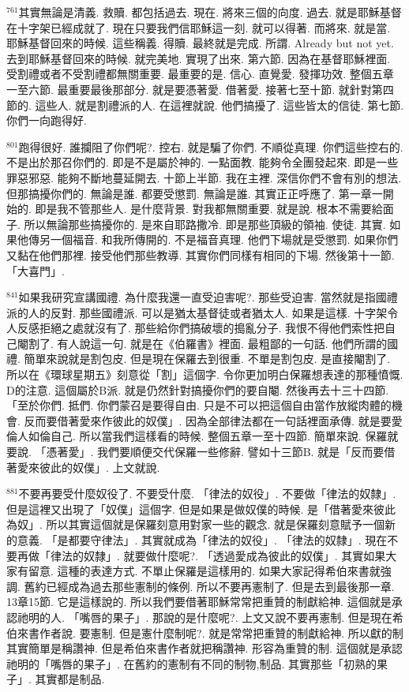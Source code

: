 \documentclass{book}
\begin{document}
$^{761}$其實無論是清義.
救贖.
都包括過去.
現在.
將來三個的向度.
過去.
就是耶穌基督在十字架已經成就了.
現在只要我們信耶穌這一刻.
就可以得著.
而將來.
就是當.
耶穌基督回來的時候.
這些稱義.
得贖.
最終就是完成.
所謂.
Already but not yet.
去到耶穌基督回來的時候.
就完美地.
實現了出來.
第六節.
因為在基督耶穌裡面.
受割禮或者不受割禮都無關重要.
最重要的是.
信心.
直覺愛.
發揮功效.
整個五章一至六節.
最重要最後那部分.
就是要憑著愛.
借著愛.
接著七至十節.
就針對第四節的.
這些人.
就是割禮派的人.
在這裡就說.
他們搞擾了.
這些皆太的信徒.
第七節.
你們一向跑得好.

$^{801}$跑得很好.
誰攔阻了你們呢?.
控右.
就是騙了你們.
不順從真理.
你們這些控右的.
不是出於那召你們的.
即是不是屬於神的.
一點面教.
能夠令全團發起來.
即是一些罪惡邪惡.
能夠不斷地蔓延開去.
十節上半節.
我在主裡.
深信你們不會有別的想法.
但那搞擾你們的.
無論是誰.
都要受懲罰.
無論是誰.
其實正正呼應了.
第一章一開始的.
即是我不管那些人.
是什麼背景.
對我都無關重要.
就是說.
根本不需要給面子.
所以無論那些搞擾你的.
是來自耶路撒冷.
即是那些頂級的領袖.
使徒.
其實.
如果他傳另一個福音.
和我所傳開的.
不是福音真理.
他們下場就是受懲罰.
如果你們又黏在他們那裡.
接受他們那些教導.
其實你們同樣有相同的下場.
然後第十一節.
「大喜門」.

$^{841}$如果我研究宣講國禮.
為什麼我還一直受迫害呢?.
那些受迫害.
當然就是指國禮派的人的反對.
那些國禮派.
可以是猶太基督徒或者猶太人.
如果是這樣.
十字架令人反感拒絕之處就沒有了.
那些給你們搞破壞的搗亂分子.
我恨不得他們索性把自己閹割了.
有人說這一句.
就是在《伯羅書》裡面.
最粗鄙的一句話.
他們所謂的國禮.
簡單來說就是割包皮.
但是現在保羅去到很重.
不單是割包皮.
是直接閹割了.
所以在《環球星期五》刻意從「割」這個字.
令你更加明白保羅想表達的那種憤慨.
D的注意.
這個屬於B派.
就是仍然針對搞擾你們的要自閹.
然後再去十三十四節.
「至於你們.
抵們.
你們蒙召是要得自由.
只是不可以把這個自由當作放縱肉體的機會.
反而要借著愛來作彼此的奴僕」.
因為全部律法都在一句話裡面承傳.
就是要愛倫人如倫自己.
所以當我們這樣看的時候.
整個五章一至十四節.
簡單來說.
保羅就要說.
「憑著愛」.
我們要順便交代保羅一些修辭.
譬如十三節B.
就是「反而要借著愛來彼此的奴僕」.
上文就說.

$^{881}$不要再要受什麼奴役了.
不要受什麼.
「律法的奴役」.
不要做「律法的奴隸」.
但是這裡又出現了「奴僕」這個字.
但是如果是做奴僕的時候.
是「借著愛來彼此為奴」.
所以其實這個就是保羅刻意用對家一些的觀念.
就是保羅刻意賦予一個新的意義.
「是都要守律法」.
其實就成為「律法的奴役」.
「律法的奴隸」.
現在不要再做「律法的奴隸」.
就要做什麼呢?.
「透過愛成為彼此的奴僕」.
其實如果大家有留意.
這種的表達方式.
不單止保羅是這樣用的.
如果大家記得希伯來書就強調.
舊約已經成為過去那些憲制的條例.
所以不要再憲制了.
但是去到最後那一章.
13章15節.
它是這樣說的.
所以我們要借著耶穌常常把重贊的制獻給神.
這個就是承認祂明的人.
「嘴唇的果子」.
那說的是什麼呢?.
上文又說不要再憲制.
但是現在希伯來書作者說.
要憲制.
但是憲什麼制呢?.
就是常常把重贊的制獻給神.
所以獻的制其實簡單是稱讚神.
但是希伯來書作者就把稱讚神.
形容為重贊的制.
這個就是承認祂明的「嘴唇的果子」.
在舊約的憲制有不同的制物,制品.
其實那些「初熟的果子」.
其實都是制品.
\end{document}
